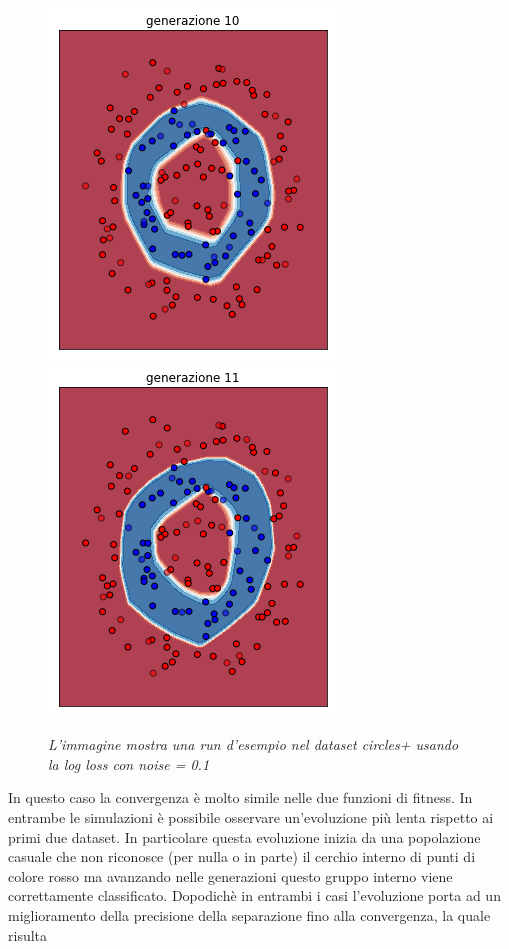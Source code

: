 \documentclass[12pt,a4paper]{report}
\begin{document}
\begin{figure}[H]
 \includegraphics[scale = 0.37]{images/circle+-rnd-log./10}
 \includegraphics[scale = 0.37]{images/circle+-rnd-log./11}
 \caption{\textit{L'immagine mostra una run d'esempio nel dataset circles+ usando la log loss con noise = 0.1}}
 \label{circles+2}
\end{figure}

In questo caso la convergenza è molto simile nelle due funzioni di fitness.
In entrambe le simulazioni è possibile osservare un'evoluzione più lenta rispetto ai primi due dataset.
In particolare questa evoluzione inizia da una popolazione casuale che non riconosce (per nulla o in parte) il cerchio interno di punti di colore rosso ma avanzando nelle generazioni questo gruppo interno viene correttamente classificato. 
Dopodichè in entrambi i casi l'evoluzione porta ad un miglioramento della precisione della separazione fino alla convergenza, la quale risulta 
\end{document}
